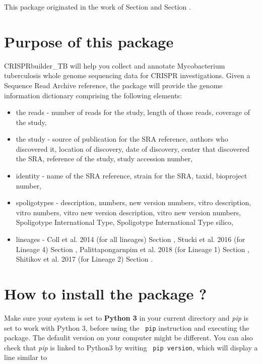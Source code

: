 \documentclass[twoside,a4paper,11pt,frenchb,openany]{report}
\begin{document}
This package originated in the work of Section \cite{guyeux1} and
Section \cite{guyeux2}.



    \section{Purpose of this package}\label{purpose-of-this-package}

    CRISPRbuilder\_TB will help you collect and annotate Mycobacterium
tuberculosis whole genome sequencing data for CRISPR investigations.
Given a Sequence Read Archive reference, the package will provide the
genome information dictionary comprising the following elements:

\begin{itemize}
\item
  the reads - number of reads for the study, length of those reads,
  coverage of the study,
\item
  the study - source of publication for the SRA reference, authors who
  discovered it, location of discovery, date of discovery, center that
  discovered the SRA, reference of the study, study accession number,
\item
  identity - name of the SRA reference, strain for the SRA, taxid,
  bioproject number,
\item
  spoligotypes - description, numbers, new version numbers, vitro
  description, vitro numbers, vitro new version description, vitro new
  version numbers, Spoligotype International Type, Spoligotype
  International Type silico,
\item
  lineages - Coll et al. 2014 (for all lineages) Section \cite{coll-preston},
  Stucki et al. 2016 (for Lineage 4) Section \cite{stucki-brites},
  Palittapongarnpim et al. 2018 (for Lineage 1) Section \cite{pali-ajaw},
  Shitikov et al. 2017 (for Lineage 2) Section \cite{shiti-kolchenko}.
\end{itemize}


    \section{How to install the package
?}\label{how-to-install-the-package}

Make sure your system is set to \textbf{Python 3} in your current directory and \textit{pip} is set to work with Python 3, before using the \texttt{ pip} instruction and executing the package. The defaulit version on your computer might be different. You can also check that \textit{pip} is linked to Python3 by writing \texttt{ pip \textemdash \textemdash version}, which will display a line similar to
\end{document}
